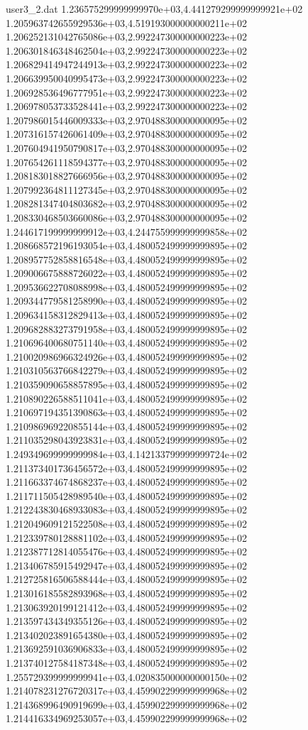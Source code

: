 \begin{filecontents}{user3_2.dat}
1.236575299999999970e+03,4.441279299999999921e+02
1.205963742655929536e+03,4.519193000000000211e+02
1.206252131042765086e+03,2.992247300000000223e+02
1.206301846348462504e+03,2.992247300000000223e+02
1.206829414947244913e+03,2.992247300000000223e+02
1.206639950040995473e+03,2.992247300000000223e+02
1.206928536496777951e+03,2.992247300000000223e+02
1.206978053733528441e+03,2.992247300000000223e+02
1.207986015446009333e+03,2.970488300000000095e+02
1.207316157426061409e+03,2.970488300000000095e+02
1.207604941950790817e+03,2.970488300000000095e+02
1.207654261118594377e+03,2.970488300000000095e+02
1.208183018827666956e+03,2.970488300000000095e+02
1.207992364811127345e+03,2.970488300000000095e+02
1.208281347404803682e+03,2.970488300000000095e+02
1.208330468503660086e+03,2.970488300000000095e+02
1.244617199999999912e+03,4.244755999999999858e+02
1.208668572196193054e+03,4.480052499999999895e+02
1.208957752858816548e+03,4.480052499999999895e+02
1.209006675888726022e+03,4.480052499999999895e+02
1.209536622708088998e+03,4.480052499999999895e+02
1.209344779581258990e+03,4.480052499999999895e+02
1.209634158312829413e+03,4.480052499999999895e+02
1.209682883273791958e+03,4.480052499999999895e+02
1.210696400680751140e+03,4.480052499999999895e+02
1.210020986966324926e+03,4.480052499999999895e+02
1.210310563766842279e+03,4.480052499999999895e+02
1.210359090658857895e+03,4.480052499999999895e+02
1.210890226588511041e+03,4.480052499999999895e+02
1.210697194351390863e+03,4.480052499999999895e+02
1.210986969220855144e+03,4.480052499999999895e+02
1.211035298043923831e+03,4.480052499999999895e+02
1.249349699999999984e+03,4.142133799999999724e+02
1.211373401736456572e+03,4.480052499999999895e+02
1.211663374674868237e+03,4.480052499999999895e+02
1.211711505428989540e+03,4.480052499999999895e+02
1.212243830468933083e+03,4.480052499999999895e+02
1.212049609121522508e+03,4.480052499999999895e+02
1.212339780128881102e+03,4.480052499999999895e+02
1.212387712814055476e+03,4.480052499999999895e+02
1.213406785915492947e+03,4.480052499999999895e+02
1.212725816506588444e+03,4.480052499999999895e+02
1.213016185582893968e+03,4.480052499999999895e+02
1.213063920199121412e+03,4.480052499999999895e+02
1.213597434349355126e+03,4.480052499999999895e+02
1.213402023891654380e+03,4.480052499999999895e+02
1.213692591036906833e+03,4.480052499999999895e+02
1.213740127584187348e+03,4.480052499999999895e+02
1.255729399999999941e+03,4.020835000000000150e+02
1.214078231276720317e+03,4.459902299999999968e+02
1.214368996490919699e+03,4.459902299999999968e+02
1.214416334969253057e+03,4.459902299999999968e+02

\end{filecontents}

